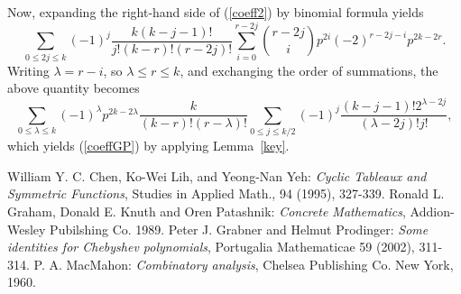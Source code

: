 \documentclass[12pt]{article}
\newcommand\la{\lambda}
\begin{document}
Now, expanding  the right-hand side of (\ref{coeff2}) by binomial
formula yields
$$
\sum_{0\leqslant2j\leqslant k}(-1)^j\frac{k(k-j-1)!}
{j!(k-r)!(r-2j)!}\sum_{i=0}^{r-2j}{r-2j\choose i}
p^{2i}(-2)^{r-2j-i}p^{2k-2r}.
$$
Writing  $\la=r-i$, so $\la\leq r\leq k$, and exchanging the order
of summations, the above quantity becomes
$$
\sum_{0\leqslant \la\leqslant k} (-1)^{\la} p^{2k-2\la
}\frac{k}{(k-r)!(r-\la)!}\sum_{0\leqslant j\leqslant
k/2}(-1)^j\frac{(k-j-1)!2^{\la-2j}}{(\la-2j)!j!},
$$
which yields (\ref{coeffGP}) by applying Lemma~\ref{key}.

\begin{thebibliography}{99}
 William Y. C. Chen, Ko-Wei Lih, and  Yeong-Nan Yeh:
\emph{Cyclic Tableaux and Symmetric Functions}, Studies in Applied
Math., 94 (1995), 327-339.
 Ronald L. Graham, Donald E. Knuth and Oren Patashnik:
\emph{Concrete Mathematics}, Addion-Wesley Pubilshing Co. 1989.
 Peter J. Grabner and Helmut Prodinger:
\emph{Some identities for Chebyshev polynomials}, Portugalia
Mathematicae 59 (2002), 311-314.
 P. A. MacMahon:
\emph{Combinatory analysis}, Chelsea Publishing Co. New York,
1960.

\end{thebibliography}
\end{document}
